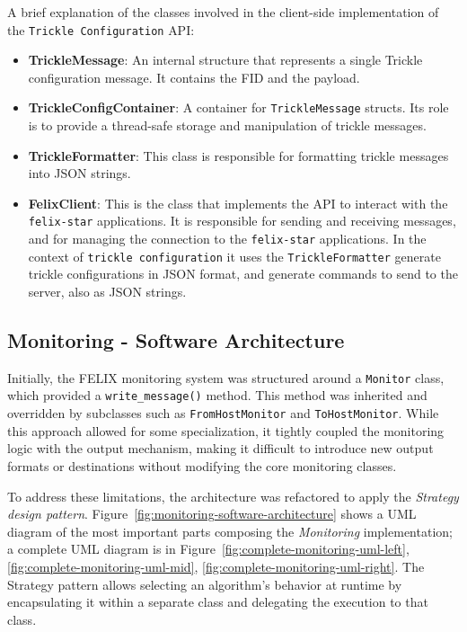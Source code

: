 A brief explanation of the classes involved in the client-side implementation of the \texttt{Trickle Configuration} \acs{API}:

\begin{itemize}
    \item \textbf{TrickleMessage}: An internal structure that represents a single Trickle configuration message. It contains the \acs{FID} and the payload.
    
    \item \textbf{TrickleConfigContainer}: A container for \texttt{TrickleMessage} structs. Its role is to provide a thread-safe storage and manipulation of trickle messages.
    
    \item \textbf{TrickleFormatter}: This class is responsible for formatting trickle messages into JSON strings.
    
    \item \textbf{FelixClient}: This is the class that implements the \acs{API} to interact with the \texttt{felix-star} applications. It is responsible for sending and receiving messages, and for managing the connection to the \texttt{felix-star} applications. In the context of \texttt{trickle configuration} it uses the \texttt{TrickleFormatter} generate trickle configurations in JSON format, and generate commands to send to the server, also as JSON strings.
\end{itemize}


\subsection{Monitoring - Software Architecture}

Initially, the \acs{FELIX} monitoring system was structured around a \texttt{Monitor} class, which provided a \texttt{write\_message()} method. This method was inherited and overridden by subclasses such as \texttt{FromHostMonitor} and \texttt{ToHostMonitor}. While this approach allowed for some specialization, it tightly coupled the monitoring logic with the output mechanism, making it difficult to introduce new output formats or destinations without modifying the core monitoring classes.

To address these limitations, the architecture was refactored to apply the \textit{Strategy design pattern}. Figure~\ref{fig:monitoring-software-architecture} shows a UML diagram of the most important parts composing the \textit{Monitoring} implementation; a complete UML diagram is in Figure~\ref{fig:complete-monitoring-uml-left}, \ref{fig:complete-monitoring-uml-mid}, \ref{fig:complete-monitoring-uml-right}. The Strategy pattern allows selecting an algorithm's behavior at runtime by encapsulating it within a separate class and delegating the execution to that class.

